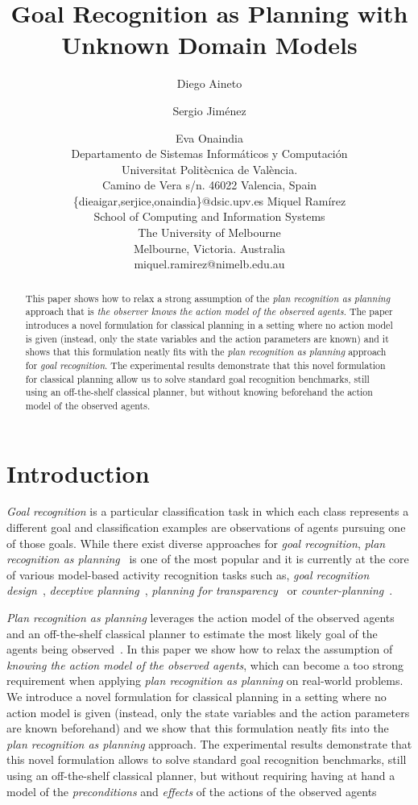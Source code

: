 \documentclass[letterpaper]{article} %
\title{Goal Recognition as Planning with Unknown Domain Models}
\author{Diego Aineto \and Sergio Jim\'enez\and Eva Onaindia\\
{\scriptsize Departamento de Sistemas Inform\'aticos y Computaci\'on}\\
{\scriptsize Universitat Polit\`ecnica de Val\`encia.}\\
{\scriptsize Camino de Vera s/n. 46022 Valencia, Spain}\\
{\scriptsize \{dieaigar,serjice,onaindia\}@dsic.upv.es}
\And Miquel Ram\'irez\\
{\scriptsize School of Computing and Information Systems}\\
{\scriptsize The University of Melbourne}\\
{\scriptsize Melbourne, Victoria. Australia}\\
{\scriptsize miquel.ramirez@nimelb.edu.au}}
\begin{document}
\maketitle
\begin{abstract}
This paper shows how to relax a strong assumption of the {\em plan recognition as planning} approach that is {\em the observer knows the action model of the observed agents}. The paper introduces a novel formulation for classical planning in a setting where no action model is given (instead, only the state variables and the action parameters are known) and it shows that this formulation neatly fits with the {\em plan recognition as planning} approach for {\em goal recognition}. The experimental results demonstrate that this novel formulation for classical planning allow us to solve standard goal recognition benchmarks, still using an off-the-shelf classical planner, but without knowing beforehand the action model of the observed agents. 
\end{abstract}

\section{Introduction}
\label{sec:introduction}
{\em Goal recognition} is a particular classification task in which each class represents a different goal and classification examples are observations of agents pursuing one of those goals. While there exist diverse approaches for {\em goal recognition}, {\em plan recognition as planning}~\cite{ramirez2009plan,ramirez2010probabilistic} is one of the most popular and it is currently at the core of various model-based activity recognition tasks such as, {\em goal recognition design}~\cite{KerenGK14}, {\em deceptive planning}~\cite{masters2017deceptive}, {\em planning for transparency}~\cite{macnally2018action} or {\em counter-planning}~\cite{PozancoEFB18}.

{\em Plan recognition as planning} leverages the action model of the observed agents and an off-the-shelf classical planner to estimate the most likely goal of the agents being observed~\cite{ramirez2012plan}. In this paper we show how to relax the assumption of {\em knowing the action model of the observed agents}, which can become a too strong requirement when applying {\em plan recognition as planning} on real-world problems.  We introduce a novel formulation for classical planning in a setting where no action model is given (instead, only the state variables and the action parameters are known beforehand) and we show that this formulation neatly fits into the {\em plan recognition as planning} approach. The experimental results demonstrate that this novel formulation allows to solve standard goal recognition benchmarks, still using an off-the-shelf classical planner, but without requiring having at hand a model of the {\em preconditions} and {\em effects} of the actions of the observed agents 
\end{document}
